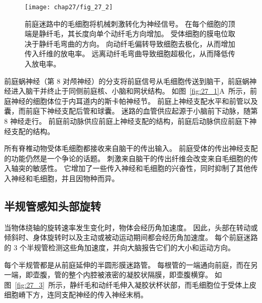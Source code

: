 \begin{figure}[htbp]
	\centering
	\texttt{[image: chap27/fig\_27\_2]}
	\caption{前庭迷路中的毛细胞将机械刺激转化为神经信号。
		在每个细胞的顶端是静纤毛，其长度向单个动纤毛方向增加。
		受体细胞的膜电位取决于静纤毛弯曲的方向。
		向动纤毛偏转导致细胞去极化，从而增加传入纤维的放电率。
		远离动纤毛弯曲导致细胞超极化，从而降低传入放电率\cite{flock1965transducing}。}
	\label{fig:27_2}
\end{figure}


前庭蜗神经（第 8 对颅神经）的分支将前庭信号从毛细胞传送到脑干，前庭蜗神经进入脑干并终止于同侧前庭核、小脑和网状结构。
如图~\ref{fig:27_1}A~所示，前庭神经的细胞体位于内耳道内的斯卡帕神经节。
前庭上神经支配水平和前管以及囊，而前庭下神经支配后管和球囊。
迷路的血管供应起源于小脑前下动脉，随第 8 神经走行。
前庭前动脉供应前庭上神经支配的结构，前庭后动脉供应前庭下神经支配的结构。


所有脊椎动物受体毛细胞都接收来自脑干的传出输入。
前庭受体的传出神经支配的功能仍然是一个争论的话题。
刺激来自脑干的传出纤维会改变来自毛细胞的传入轴突的敏感性。
它增加了一些传入神经和毛细胞的兴奋性，同时抑制了其他传入神经和毛细胞，并且因物种而异。



\subsection{半规管感知头部旋转}

当物体绕轴的旋转速率发生变化时，物体会经历角加速度。
因此，头部在转动或倾斜时、身体旋转时以及主动或被动运动期间都会经历角加速度。
每个前庭迷路的 3 个半规管检测这些角加速度，并向大脑报告它们的大小和运动方向。


每个半规管都是从前庭延伸的半圆形膜迷路管。
每根管的一端通向前庭，而在另一端，即壶腹，管的整个内腔被液密的凝胶状隔膜，即壶腹横穿。
如图~\ref{fig:27_3}~所示，静纤毛和动纤毛伸入凝胶状杯状部，而毛细胞位于受体上皮细胞嵴下方，连同支配神经的传入神经末梢。


